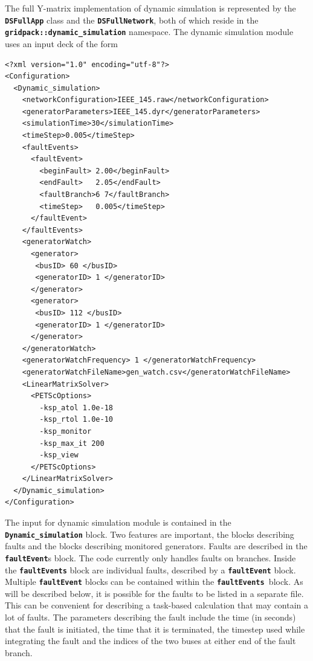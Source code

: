 \documentclass[12pt]{report} %
\begin{document}
The full Y-matrix implementation of dynamic simulation is represented by the \texttt{\textbf{DSFullApp}} class and the \texttt{\textbf{DSFullNetwork}}, both of which reside in the \texttt{\textbf{gridpack::dynamic\_simulation}} namespace.
The dynamic simulation module uses an input deck of the form
{
\color{red}
\begin{Verbatim}[fontseries=b]
<?xml version="1.0" encoding="utf-8"?>
<Configuration>
  <Dynamic_simulation>
    <networkConfiguration>IEEE_145.raw</networkConfiguration>
    <generatorParameters>IEEE_145.dyr</generatorParameters>
    <simulationTime>30</simulationTime>
    <timeStep>0.005</timeStep>
    <faultEvents>
      <faultEvent>
        <beginFault> 2.00</beginFault>
        <endFault>   2.05</endFault>
        <faultBranch>6 7</faultBranch>
        <timeStep>   0.005</timeStep>
      </faultEvent>
    </faultEvents>
    <generatorWatch>
      <generator>
       <busID> 60 </busID>
       <generatorID> 1 </generatorID>
      </generator>
      <generator>
       <busID> 112 </busID>
       <generatorID> 1 </generatorID>
      </generator>
    </generatorWatch>
    <generatorWatchFrequency> 1 </generatorWatchFrequency>
    <generatorWatchFileName>gen_watch.csv</generatorWatchFileName>
    <LinearMatrixSolver>
      <PETScOptions>
        -ksp_atol 1.0e-18
        -ksp_rtol 1.0e-10
        -ksp_monitor
        -ksp_max_it 200
        -ksp_view
      </PETScOptions>
    </LinearMatrixSolver>
  </Dynamic_simulation>
</Configuration>
\end{Verbatim}
}

The input for dynamic simulation module is contained in the \texttt{\textbf{Dynamic\_simulation}} block. Two features are important, the blocks describing faults and the blocks describing monitored generators. Faults are described in the \texttt{\textbf{faultEvent}}s block. The code currently only handles faults on branches. Inside the \texttt{\textbf{faultEvents}} block are individual faults, described by a \texttt{\textbf{faultEvent}} block. Multiple \texttt{\textbf{faultEvent}} blocks can be contained within the \texttt{\textbf{faultEvents }}block. As will be described below, it is possible for the faults to be listed in a separate file. This can be convenient for describing a task-based calculation that may contain a lot of faults. The parameters describing the fault include the time (in seconds) that the fault is initiated, the time that it is terminated, the timestep used while integrating the fault and the indices of the two buses at either end of the fault branch.
\end{document}
